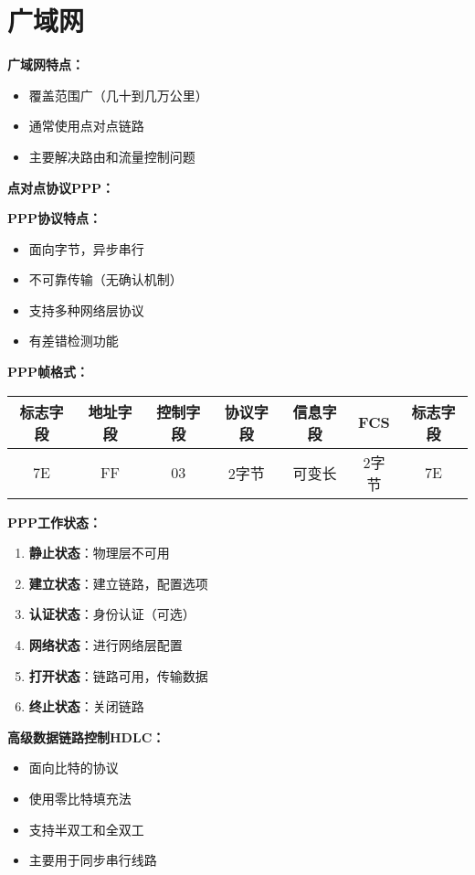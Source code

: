 \documentclass[lang=cn,newtx,10pt,scheme=chinese]{../../elegantbook}
\begin{document}
\section{广域网}

\textbf{广域网特点：}
\begin{itemize}
  \item 覆盖范围广（几十到几万公里）
  \item 通常使用点对点链路
  \item 主要解决路由和流量控制问题
\end{itemize}

\textbf{点对点协议PPP：}

\textbf{PPP协议特点：}
\begin{itemize}
  \item 面向字节，异步串行
  \item 不可靠传输（无确认机制）
  \item 支持多种网络层协议
  \item 有差错检测功能
\end{itemize}

\textbf{PPP帧格式：}
\begin{center}
\begin{tabular}{|c|c|c|c|c|c|c|}
\hline
标志字段 & 地址字段 & 控制字段 & 协议字段 & 信息字段 & FCS & 标志字段 \\
\hline
7E & FF & 03 & 2字节 & 可变长 & 2字节 & 7E \\
\hline
\end{tabular}
\end{center}

\textbf{PPP工作状态：}
\begin{enumerate}
  \item \textbf{静止状态}：物理层不可用
  \item \textbf{建立状态}：建立链路，配置选项
  \item \textbf{认证状态}：身份认证（可选）
  \item \textbf{网络状态}：进行网络层配置
  \item \textbf{打开状态}：链路可用，传输数据
  \item \textbf{终止状态}：关闭链路
\end{enumerate}

\textbf{高级数据链路控制HDLC：}
\begin{itemize}
  \item 面向比特的协议
  \item 使用零比特填充法
  \item 支持半双工和全双工
  \item 主要用于同步串行线路
\end{itemize}
\end{document}
